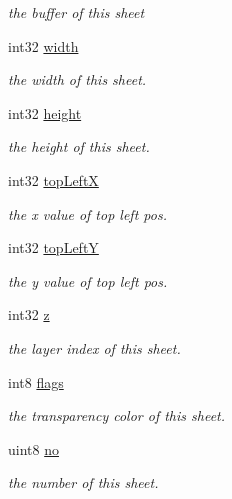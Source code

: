 \begin{DoxyCompactItemize}
\begin{DoxyCompactList}\small\item\em the buffer of this sheet \end{DoxyCompactList}\item 
int32 \hyperlink{struct_s_h_e_e_t_a5f348f86097b8a7118f837fe5fb8896a}{width}
\begin{DoxyCompactList}\small\item\em the width of this sheet. \end{DoxyCompactList}\item 
int32 \hyperlink{struct_s_h_e_e_t_a62a3cdb715fff9c04d91fac8d08d2966}{height}
\begin{DoxyCompactList}\small\item\em the height of this sheet. \end{DoxyCompactList}\item 
int32 \hyperlink{struct_s_h_e_e_t_a76309d647cc77432f2743966699f2a6a}{top\+Left\+X}
\begin{DoxyCompactList}\small\item\em the x value of top left pos. \end{DoxyCompactList}\item 
int32 \hyperlink{struct_s_h_e_e_t_a21ffe33973d8fbc628ad4e5661abc6a2}{top\+Left\+Y}
\begin{DoxyCompactList}\small\item\em the y value of top left pos. \end{DoxyCompactList}\item 
int32 \hyperlink{struct_s_h_e_e_t_a610f3c03219d584d4d27802b03794084}{z}
\begin{DoxyCompactList}\small\item\em the layer index of this sheet. \end{DoxyCompactList}\item 
int8 \hyperlink{struct_s_h_e_e_t_aab52a347b0e40e5b5d67a6110d672c2f}{flags}
\begin{DoxyCompactList}\small\item\em the transparency color of this sheet. \end{DoxyCompactList}\item 
uint8 \hyperlink{struct_s_h_e_e_t_a09f948aae436f5740dc5107b820c517e}{no}
\begin{DoxyCompactList}\small\item\em the number of this sheet. \end{DoxyCompactList}\end{DoxyCompactItemize}


